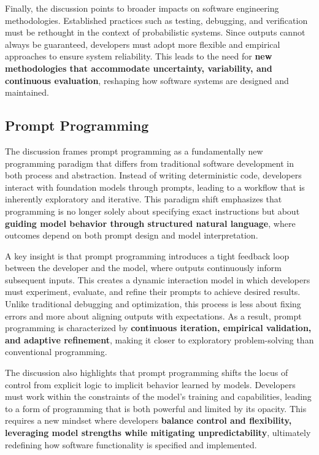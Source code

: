 Finally, the discussion points to broader impacts on software engineering methodologies. Established practices such as testing, debugging, and verification must be rethought in the context of probabilistic systems. Since outputs cannot always be guaranteed, developers must adopt more flexible and empirical approaches to ensure system reliability. This leads to the need for \textbf{new methodologies that accommodate uncertainty, variability, and continuous evaluation}, reshaping how software systems are designed and maintained.

\subsection{Prompt Programming}
The discussion frames prompt programming as a fundamentally new programming paradigm that differs from traditional software development in both process and abstraction. Instead of writing deterministic code, developers interact with foundation models through prompts, leading to a workflow that is inherently exploratory and iterative. This paradigm shift emphasizes that programming is no longer solely about specifying exact instructions but about \textbf{guiding model behavior through structured natural language}, where outcomes depend on both prompt design and model interpretation.

A key insight is that prompt programming introduces a tight feedback loop between the developer and the model, where outputs continuously inform subsequent inputs. This creates a dynamic interaction model in which developers must experiment, evaluate, and refine their prompts to achieve desired results. Unlike traditional debugging and optimization, this process is less about fixing errors and more about aligning outputs with expectations. As a result, prompt programming is characterized by \textbf{continuous iteration, empirical validation, and adaptive refinement}, making it closer to exploratory problem-solving than conventional programming.

The discussion also highlights that prompt programming shifts the locus of control from explicit logic to implicit behavior learned by models. Developers must work within the constraints of the model’s training and capabilities, leading to a form of programming that is both powerful and limited by its opacity. This requires a new mindset where developers \textbf{balance control and flexibility, leveraging model strengths while mitigating unpredictability}, ultimately redefining how software functionality is specified and implemented.


